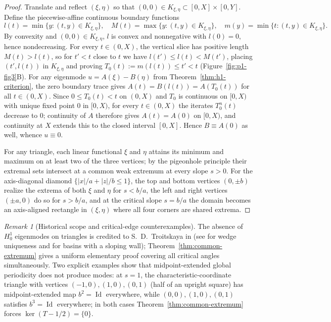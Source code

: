 \documentclass[11pt,reqno]{amsart}
\theoremstyle{definition}
\theoremstyle{remark}
\newtheorem{remark}[theorem]{Remark}
\DeclareMathOperator{\Id}{Id}
\begin{document}
\begin{proof}
Translate and reflect $(\xi,\eta)$ so that $(0,0) \in K_{\xi,\eta} \subset [0,X] \times [0,Y]$. Define the piecewise-affine continuous boundary functions
\[
  l(t) = \min\{y : (t,y) \in K_{\xi,\eta}\}, \quad M(t) = \max\{y : (t,y) \in K_{\xi,\eta}\}, \quad m(y) = \min\{t : (t,y) \in K_{\xi,\eta}\}.
\]
By convexity and $(0,0) \in K_{\xi,\eta}$, $l$ is convex and nonnegative with $l(0) = 0$, hence nondecreasing. For every $t \in (0, X)$, the vertical slice has positive length $M(t) > l(t)$, so for $t' < t$ close to $t$ we have $l(t') \le l(t) < M(t')$, placing $(t', l(t))$ in $K_{\xi,\eta}$ and proving $T_0(t) := m(l(t)) \le t' < t$ (Figure~\ref{fig:p1-fig3}B). For any eigenmode $u = A(\xi) - B(\eta)$ from Theorem~\ref{thm:h1-criterion}, the zero boundary trace gives $A(t) = B(l(t)) = A(T_0(t))$ for all $t \in (0, X)$. Since $0 \le T_0(t) < t$ on $(0, X)$ and $T_0$ is continuous on $[0, X)$ with unique fixed point $0$ in $[0, X)$, for every $t \in (0, X)$ the iterates $T_0^n(t)$ decrease to $0$; continuity of $A$ therefore gives $A(t) = A(0)$ on $[0, X)$, and continuity at $X$ extends this to the closed interval $[0, X]$. Hence $B \equiv A(0)$ as well, whence $u \equiv 0$.

For any triangle, each linear functional $\xi$ and $\eta$ attains its minimum and maximum on at least two of the three vertices; by the pigeonhole principle their extremal sets intersect at a common weak extremum at every slope $s > 0$. For the axis-diagonal diamond $\{|x|/a + |z|/b \le 1\}$, the top and bottom vertices $(0,\pm b)$ realize the extrema of both $\xi$ and $\eta$ for $s < b/a$, the left and right vertices $(\pm a, 0)$ do so for $s > b/a$, and at the critical slope $s = b/a$ the domain becomes an axis-aligned rectangle in $(\xi,\eta)$ where all four corners are shared extrema.
\end{proof}

\begin{remark}[Historical scope and critical-edge counterexamples]
The absence of $H_0^1$ eigenmodes on triangles is credited to S.~D.~Troitskaya in \cite[\S 1.3]{DWZ2025} (see \cite{Troitskaya1999} for wedge uniqueness and \cite{Troitskaya2017} for basins with a sloping wall); Theorem~\ref{thm:common-extremum} gives a uniform elementary proof covering all critical angles simultaneously. Two explicit examples show that midpoint-extended global periodicity does not produce modes: at $s = 1$, the characteristic-coordinate triangle with vertices $(-1,0), (1,0), (0,1)$ (half of an upright square) has midpoint-extended map $b^2 = \Id$ everywhere, while $(0,0), (1,0), (0,1)$ satisfies $b^3 = \Id$ everywhere; in both cases Theorem~\ref{thm:common-extremum} forces $\ker(T - 1/2) = \{0\}$.
\end{remark}
\end{document}
